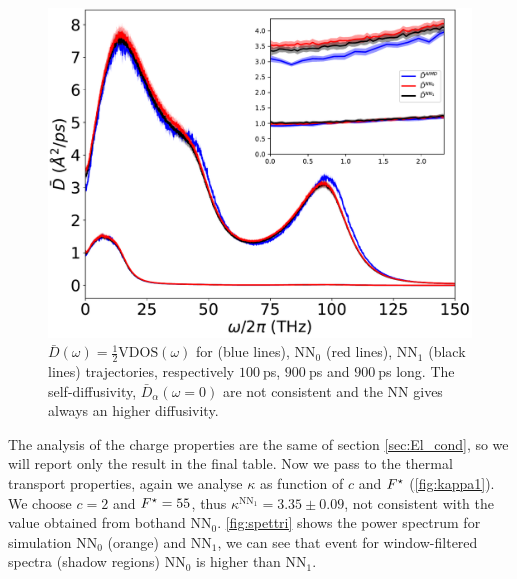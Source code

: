 \documentclass[%
 reprint,
 amsmath,amssymb,
 aps,
prb,
]{revtex4-2}
\begin{document}
\begin{figure}[bt]
    \centering
    \includegraphics[width=\linewidth]{figs/VDOS_all.pdf}
    \caption{$\bar{D}(\omega) = \frac{1}{2}\text{VDOS}(\omega)$ for \ai (blue lines), NN$_0$ (red lines), NN$_1$ (black lines) trajectories, respectively $100~$ps, $900~$ps and $900~$ps long. The self-diffusivity, $\bar{D}_{\alpha}(\omega=0)$ are not consistent and the NN gives always an higher diffusivity.} 
    \label{fig:VDOS1}
\end{figure}

The analysis of the charge properties are the same of section \cref{sec:El_cond}, so we will report only the result in the final table. Now we pass to the thermal transport properties, again we analyse $\kappa$ as function of $c$ and $F^{\star}$ (\cref{fig:kappa1}). We choose $c=2$ and $F^{\star}=55$, thus $\kappa^{\text{NN}_1}=3.35 \pm 0.09$, not consistent with the value obtained from both\ai and NN$_0$. \cref{fig:spettri} shows the power spectrum for simulation NN$_0$ (orange) and NN$_1$, we can see that event for window-filtered spectra (shadow regions) NN$_0$ is higher than NN$_1$.
\end{document}
